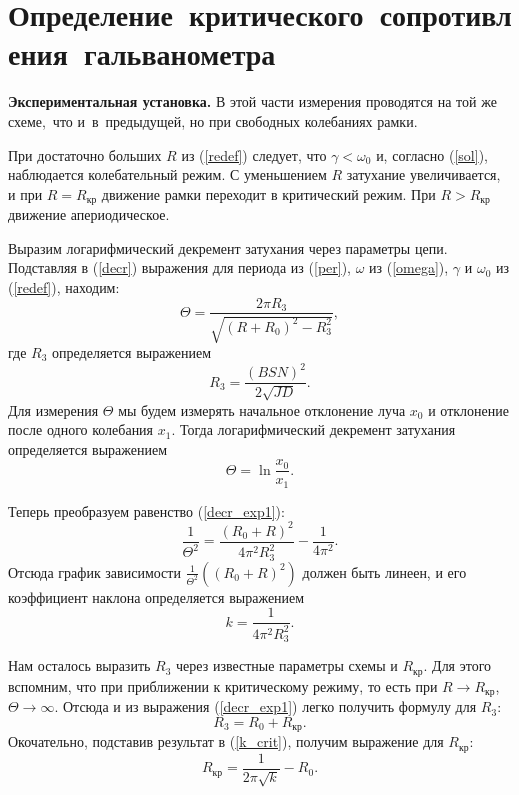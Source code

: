 \documentclass[12pt,a4paper]{article}
\begin{document}
\section{Определение~критического~сопротивления~гальванометра} 
\textbf{Экспериментальная установка.} В этой части измерения проводятся на той же схеме,~что и~в~предыдущей, но при свободных колебаниях рамки.

При достаточно больших $R$ из (\ref{redef}) следует, что $\gamma < \omega_0$ и, согласно (\ref{sol}), наблюдается колебательный режим. С уменьшением $R$ затухание увеличивается, и при $R = R_{\text{кр}}$ движение рамки переходит в критический режим. При $R > R_{\text{кр}}$ движение апериодическое.

Выразим логарифмический декремент затухания через параметры цепи. Подставляя в (\ref{decr}) выражения для периода из (\ref{per}), $\omega$ из (\ref{omega}),  $\gamma$ и $\omega_0$ из (\ref{redef}), находим:
\begin{equation}
\Theta = \frac{2\pi R_3}{\sqrt{{(R+R_0)}^2-R_3^2}},\label{decr_exp1}
\end{equation}
где $R_3$ определяется выражением
\begin{equation}
R_3 = \frac{\left(BSN\right)^2}{2\sqrt{JD}}.\label{r3}
\end{equation}
Для измерения $\Theta$ мы будем измерять начальное отклонение луча $x_0$ и отклонение после одного колебания $x_1$. Тогда логарифмический декремент затухания определяется выражением
\begin{equation}
\Theta = \ln\frac{x_0}{x_1}.\label{decr_exp_d}
\end{equation}

Теперь преобразуем равенство (\ref{decr_exp1}):
\begin{equation}
\frac{1}{\Theta^2}=\frac{\left(R_0+R\right)^2}{4\pi^2R_3^2} - \frac{1}{4\pi^2}.\label{decr_exp2}
\end{equation}
Отсюда график зависимости $\frac{1}{\Theta^2}\left(\left(R_0+R\right)^2\right)$ должен быть линеен, и его коэффициент наклона определяется выражением
\begin{equation}
k = \frac{1}{4\pi^2R_3^2}.\label{k_crit}
\end{equation}

Нам осталось выразить $R_3$ через известные параметры схемы и $R_\text{кр}$. Для этого вспомним, что при приближении к критическому режиму, то есть при $R\to R_\text{кр}$, $\Theta\to\infty$. Отсюда и из выражения (\ref{decr_exp1}) легко получить формулу для $R_3$:
\begin{equation}
R_3 = R_0 + R_\text{кр}.\label{r_3}
\end{equation}
Окочательно, подставив результат в (\ref{k_crit}), получим выражение для $R_\text{кр}:$
\begin{equation}
R_\text{кр} = \frac{1}{2\pi\sqrt{k}} - R_0.\label{r_crit}
\end{equation}
\end{document}
